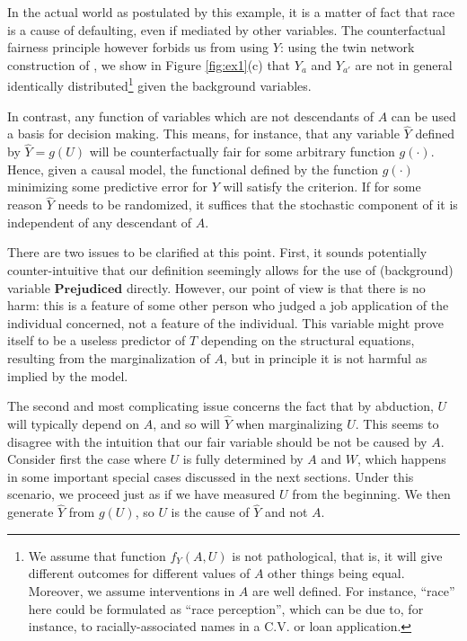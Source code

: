 In the actual world as postulated by this example, it is a matter of
fact that race is a cause of defaulting, even if mediated by other
variables. The counterfactual fairness principle however forbids us
from using $Y$: using the twin network construction of
\citet{pearl:00}, we show in Figure \ref{fig:ex1}(c) that $Y_a$ and
$Y_{a'}$ are not in general identically distributed\footnote{We assume
  that function $f_Y(A, U)$ is not pathological, that is, it will give
  different outcomes for different values of $A$ other things being
  equal. Moreover, we assume interventions in $A$ are well defined.
  For instance, ``race'' here could be formulated as ``race
  perception'', which can be due to, for instance, to
  racially-associated names in a C.V. or loan application.}  given the
background variables.

In contrast, any function of variables which are not descendants of
$A$ can be used a basis for decision making. This means, for instance,
that any variable $\hat Y$ defined by $\hat Y = g(U)$ will be counterfactually
fair for some arbitrary function $g(\cdot)$. Hence, given a causal
model, the functional defined by the function $g(\cdot)$ 
minimizing some predictive error for $Y$ will satisfy the criterion.
If for some reason $\hat Y$ needs to be randomized, it suffices that the
stochastic component of it is independent of any descendant of $A$.

There are two issues to be clarified at this point. First,
it sounds potentially counter-intuitive that our definition
seemingly allows for the use of (background) variable $\textbf{Prejudiced}$
directly. However, our point of view is that there is no harm: this is
a feature of some other person who judged a job application of the
individual concerned, not a feature of the individual. This variable
might prove itself to be a useless predictor of $T$ depending on the
structural equations, resulting from the marginalization of $A$, but
in principle it is not harmful as implied by the model.

The second and most complicating issue concerns the fact that by
abduction, $U$ will typically depend on $A$, and so will $\hat Y$ when
marginalizing $U$. This seems to disagree with the intuition that our
fair variable should be not be caused by $A$. Consider first the case
where $U$ is fully determined by $A$ and $W$, which happens in some
important special cases discussed in the next sections. Under this
scenario, we proceed just as if we have measured $U$ from the
beginning. We then generate $\hat Y$ from $g(U)$, so $U$ is the cause of $\hat
Y$ and not $A$.


